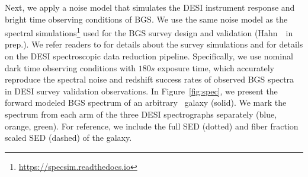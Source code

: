 Next, we apply a noise model that simulates the DESI instrument response and
bright time observing conditions of BGS. 
We use the same noise model as the spectral 
simulations\footnote{\href{https://specsim.readthedocs.io/en/stable/guide.html}{https://specsim.readthedocs.io}} 
used for the BGS survey design and validation (Hahn~\etal~in prep.). 
We refer readers to  for details about the survey
simulations and  for details on the DESI spectroscopic
data reduction pipeline.
Specifically, we use nominal dark time observing conditions with $180s$
exposure time, which accurately reproduce the spectral noise and redshift
success rates of observed BGS spectra in DESI survey validation observations.
In Figure~\ref{fig:spec}, we present the forward modeled BGS spectrum of an
arbitrary \lgal~galaxy (solid). 
We mark the spectrum from each arm of the three DESI spectrographs separately 
(blue, orange, green).
For reference, we include the full SED (dotted) and fiber fraction scaled SED
(dashed) of the galaxy. 



